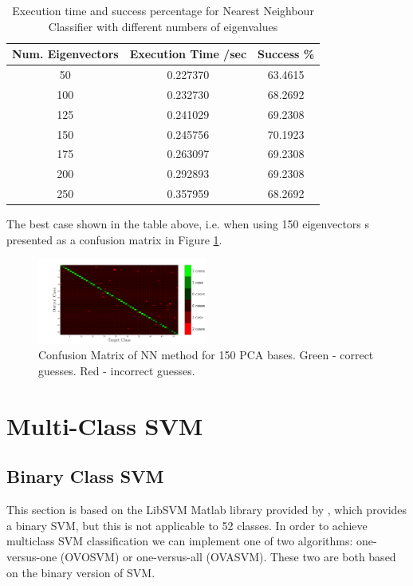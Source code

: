 \documentclass[10pt,twocolumn,letterpaper]{article}
\begin{document}
\begin{table}[H]
\begin{center}
\small
\begin{tabular}{||c c c||}
\hline
\bf Num. Eigenvectors & \bf Execution Time /sec & \bf Success \%\\ [0.5ex]
\hline \hline
50 & 0.227370 & 63.4615 \\ [0.5ex]
\hline
100 & 0.232730 & 68.2692 \\ [0.5ex]
\hline
125 & 0.241029 & 69.2308 \\ [0.5ex]
\hline
150 & 0.245756 & 70.1923 \\ [0.5ex]
\hline
175 & 0.263097 & 69.2308 \\ [0.5ex]
\hline
200 & 0.292893 & 69.2308 \\ [0.5ex]
\hline
250 & 0.357959 & 68.2692 \\ [0.5ex]
\hline
\end{tabular}
\end{center}
\caption{Execution time and success percentage for Nearest Neighbour Classifier with different numbers of eigenvalues} \label{tab:NN_table}
\end{table}

The best case shown in the table above, i.e. when using 150 eigenvectors s presented as a confusion matrix in Figure \ref{fig:confNN}.

\begin{figure}[H]
\begin{center}
  
    \includegraphics[width=0.5\textwidth]{../results/Q2B_NN_confusion}

  \caption{Confusion Matrix of NN method for 150 PCA bases. Green - correct guesses. Red - incorrect guesses. \label{fig:confNN}}

\end{center}
\end{figure}

\section{Multi-Class SVM}
\subsection{Binary Class SVM}
This section is based on the LibSVM Matlab library provided by \cite{LibSVM}, which provides a binary SVM, but this is not applicable to 52 classes. In order to achieve multiclass SVM classification we can implement one of two algorithms: one-versus-one (OVOSVM) or one-versus-all (OVASVM). These two are both based on the binary version of SVM.
\end{document}
